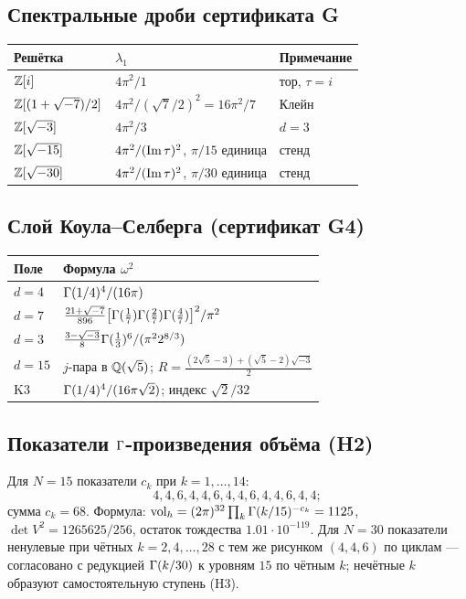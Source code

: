 \subsection{Спектральные дроби сертификата G}

\begin{center}
\small
\begin{tabular}{@{}l l l@{}}
\toprule
Решётка & $\lambda_1$ & Примечание \\
\midrule
$\mathbb{Z}[i]$ & $4\pi^2/1$ & тор, $\tau=i$ \\
$\mathbb{Z}[(1+\sqrt{-7})/2]$ & $4\pi^2/(\sqrt7/2)^2=16\pi^2/7$ & Клейн \\
$\mathbb{Z}[\sqrt{-3}]$ & $4\pi^2/3$ & $d=3$ \\
$\mathbb{Z}[\sqrt{-15}]$ & $4\pi^2/(\operatorname{Im}\tau)^2$, $\pi/15$ единица &
  стенд \\
$\mathbb{Z}[\sqrt{-30}]$ & $4\pi^2/(\operatorname{Im}\tau)^2$, $\pi/30$ единица &
  стенд \\
\bottomrule
\end{tabular}
\end{center}

\subsection{Слой Коула--Селберга (сертификат G4)}

\begin{center}
\small
\begin{tabular}{@{}l l@{}}
\toprule
Поле & Формула $\omega^2$ \\
\midrule
$d=4$ & $\Gamma(1/4)^4/(16\pi)$ \\
$d=7$ & $\tfrac{21+\sqrt{-7}}{896}
  \bigl[\Gamma(\tfrac17)\Gamma(\tfrac27)\Gamma(\tfrac47)\bigr]^2/\pi^2$ \\
$d=3$ & $\tfrac{3-\sqrt{-3}}{8}\Gamma(\tfrac13)^6/(\pi^2 2^{8/3})$ \\
$d=15$ & $j$-пара в $\mathbb{Q}(\sqrt5)$;
  $R=\tfrac{(2\sqrt5-3)+(\sqrt5-2)\sqrt{-3}}2$ \\
K3 & $\Gamma(1/4)^4/(16\pi\sqrt2)$; индекс $\sqrt2/32$ \\
\bottomrule
\end{tabular}
\end{center}

\subsection{Показатели $\Gamma$-произведения объёма (H2)}

Для $N=15$ показатели $c_k$ при $k=1,\dots,14$:
\[
  4,4,6,4,4,6,4,4,6,4,4,6,4,4;
\]
сумма $c_k=68$. Формула:
$\mathrm{vol}_h=(2\pi)^{32}\prod_k\Gamma(k/15)^{-c_k}=1125$,
$\det V^2=1265625/256$, остаток тождества $1.01\cdot10^{-119}$.
Для $N=30$ показатели ненулевые при чётных
$k=2,4,\dots,28$ с тем же рисунком $(4,4,6)$ по циклам ---
согласовано с редукцией $\Gamma(k/30)$ к уровням $15$ по чётным $k$;
нечётные $k$ образуют самостоятельную ступень (H3).

